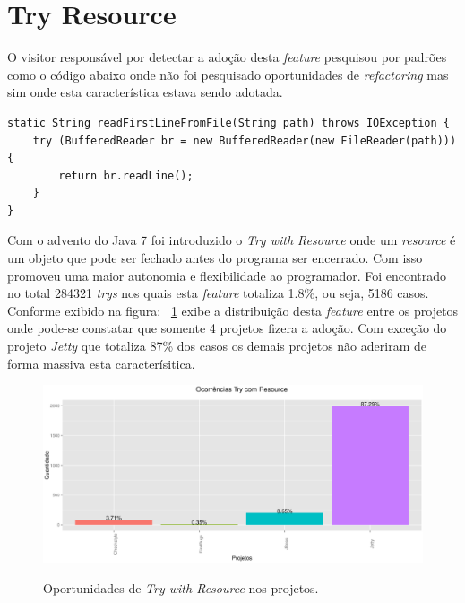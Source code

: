 \section{Try Resource}
O visitor responsável por detectar a adoção desta \textit{feature} pesquisou por padrões como o código abaixo onde não foi pesquisado oportunidades de \textit{refactoring} mas sim onde esta característica estava sendo adotada.
\begin{lstlisting}
static String readFirstLineFromFile(String path) throws IOException {
	try (BufferedReader br = new BufferedReader(new FileReader(path))) {
		return br.readLine();
	}
}
\end{lstlisting}

Com o advento do Java 7 foi introduzido o \textit{Try with Resource} onde um \textit{resource} é um objeto que pode ser fechado antes do programa ser encerrado. Com isso promoveu uma maior autonomia e flexibilidade ao programador. Foi encontrado no total 284321 \textit{trys} nos quais  esta \textit{feature} totaliza 1.8\%, ou seja, 5186 casos. Conforme exibido na figura: ~\ref{fig:Try with Resource} exibe a distribuição desta \textit{feature} entre os projetos onde pode-se constatar que somente 4 projetos fizera a adoção. Com exceção do projeto \textit{Jetty} que totaliza 87\% dos casos os demais projetos não aderiram de forma massiva esta caracterísitica.


\begin{figure}[h]
	\center
	\includegraphics[scale=0.5]{Imagens/ocorrenciasTryResource}
	\label{fig:Try with Resource}
	\caption{Oportunidades de \textit{Try with Resource} nos projetos.}
\end{figure}



